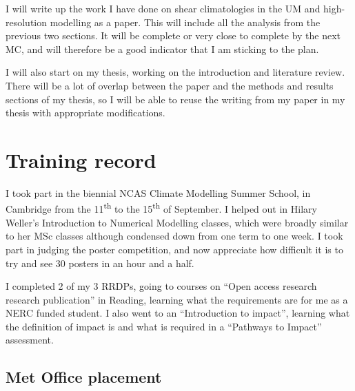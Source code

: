 \documentclass[11pt,a4paper]{article}
\newcommand{\ts}{\textsuperscript}
\begin{document}
I will write up the work I have done on shear climatologies in the UM and high-resolution modelling as a paper. This will include all the analysis from the previous two sections. It will be complete or very close to complete by the next MC, and will therefore be a good indicator that I am sticking to the plan.

I will also start on my thesis, working on the introduction and literature review. There will be a lot of overlap between the paper and the methods and results sections of my thesis, so I will be able to reuse the writing from my paper in my thesis with appropriate modifications.

\section{Training record}
\label{sec:Training record}

I took part in the biennial NCAS Climate Modelling Summer School, in Cambridge from the 11\ts{th} to the 15\ts{th} of September. I helped out in Hilary Weller's Introduction to Numerical Modelling classes, which were broadly similar to her MSc classes although condensed down from one term to one week. 
I took part in judging the poster competition, and now appreciate how difficult it is to try and see 30 posters in an hour and a half. 

I completed 2 of my 3 RRDPs, going to courses on ``Open access research research publication'' in Reading, learning what the requirements are for me as a NERC funded student. I also went to an ``Introduction to impact'', learning what the definition of impact is and what is required in a ``Pathways to Impact'' assessment. 

\subsection{Met Office placement}
\label{sec:Met Office placement}
\end{document}
